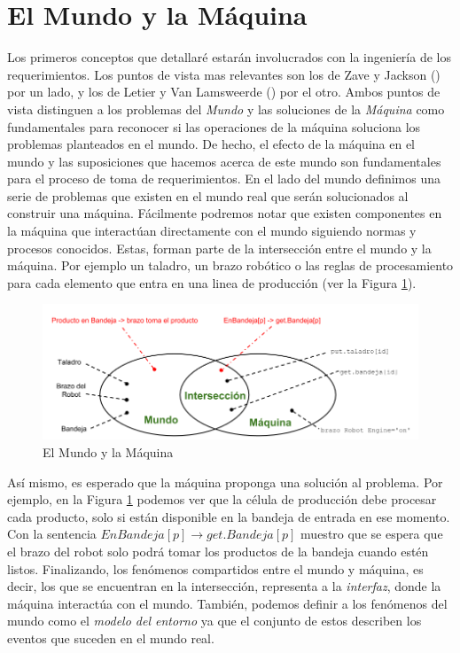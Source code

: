 \section{El Mundo y la Máquina}

Los primeros conceptos que detallaré estarán involucrados con la ingeniería de los requerimientos. Los puntos de vista
mas relevantes son los de Zave y Jackson (\cite{Zave97fourdark, Jackson:1995:SRA:210207, 5071113}) por un lado, y los de
Letier y Van Lamsweerde (\cite{879820, VanLamsweerde:2001:GRE:882477.883624}) por el otro. Ambos puntos de vista
distinguen a los problemas del \emph{Mundo} y las soluciones de la \emph{Máquina} como fundamentales para reconocer si 
las operaciones de la máquina soluciona los problemas planteados en el mundo. De hecho, el efecto de la máquina en el mundo y las
suposiciones que hacemos acerca de este mundo son fundamentales para el proceso de toma de requerimientos. En el lado
del mundo definimos una serie de problemas que existen en el mundo real que serán solucionados al construir una máquina.
Fácilmente podremos notar que existen componentes en la máquina que interactúan directamente con el mundo siguiendo
normas y procesos conocidos. Estas, forman parte de la intersección entre el mundo y la máquina. Por ejemplo un taladro,
un brazo robótico o las reglas de procesamiento para cada elemento que entra en una linea de producción (ver la Figura
\ref{world_and_machine}).

\begin{figure}
    \centering
    \includegraphics[scale=0.45]{img/world_and_machine.png}
    \caption{El Mundo y la Máquina}
    \label{world_and_machine}
\end{figure}

Así mismo, es esperado que la máquina proponga una solución al problema. Por ejemplo, en la Figura \ref{world_and_machine}
podemos ver que la célula de producción debe procesar cada producto, solo si están disponible en la bandeja de entrada en ese
momento. Con la sentencia $EnBandeja[p] \rightarrow get.Bandeja[p]$ muestro que se espera que el brazo del robot solo
podrá tomar los productos de la bandeja cuando estén listos. Finalizando, los fenómenos compartidos entre el mundo y
máquina, es decir, los que se encuentran en la intersección, representa a la \emph{interfaz}, donde la máquina
interactúa con el mundo. También, podemos definir a los fenómenos del mundo como el \emph{modelo del entorno} ya que el
conjunto de estos describen los eventos que suceden en el mundo real.

